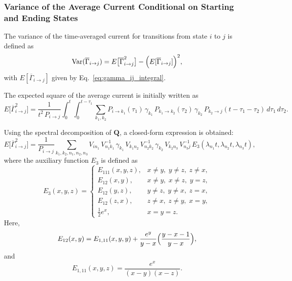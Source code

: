 \documentclass[pdflatex,sn-nature]{sn-jnl}%
\theoremstyle{thmstyleone}%
\theoremstyle{thmstyletwo}%
\theoremstyle{thmstylethree}%
\begin{document}
\subsubsection{Variance of the Average Current Conditional on Starting and Ending States}

The variance of the time-averaged current for transitions from state \(i\) to \(j\) is defined as
\begin{equation}
\mathrm{Var}(\overline{\Gamma}_{i\rightarrow j}) = E\bigl[\overline{\Gamma}_{i\rightarrow j}^2\bigr] - \Bigl(E[\overline{\Gamma}_{i\rightarrow j}]\Bigr)^2,
\label{eq:variance_gamma_short}
	\end{equation}
	with \(E[\overline{\Gamma}_{i\rightarrow j}]\) given by Eq.~\ref{eq:gamma_ij_integral}.

The expected square of the average current is initially written as
\begin{equation}
E\bigl[\overline{\Gamma}_{i\rightarrow j}^2\bigr] = \frac{1}{t^2\,P_{i\rightarrow j}} \int_0^t\int_0^{t-\tau_1} \sum_{k_1,k_2} P_{i\rightarrow k_1}(\tau_1)\,\gamma_{k_1}\,P_{k_1\rightarrow k_2}(\tau_2)\,\gamma_{k_2}\,P_{k_2\rightarrow j}(t-\tau_1-\tau_2)\,d\tau_1\,d\tau_2.
\label{eq:expected_square_integral_short}
\end{equation}

Using the spectral decomposition of \(\mathbf{Q}\), a closed-form expression is obtained:
	\begin{equation}
	E\bigl[\overline{\Gamma}_{i\rightarrow j}^2\bigr] = \frac{1}{P_{i\rightarrow j}} \sum_{k_1,k_2,n_1,n_2,n_3} V_{i n_1}\,V^{-1}_{n_1 k_1}\,\gamma_{k_1}\,V_{k_1 n_2}\,V^{-1}_{n_2 k_2}\,\gamma_{k_2}\,V_{k_2 n_3}\,V^{-1}_{n_3 j}\,E_3(\lambda_{n_1}t,\lambda_{n_2}t,\lambda_{n_3}t),
\label{eq:expected_square_closed_short}
\end{equation}
where the auxiliary function \(E_3\) is defined as
\begin{equation}
E_3(x,y,z)= 
\begin{cases}
E_{111}(x,y,z), & x\neq y,\; y\neq z,\; z\neq x,\\[1mm]
E_{12}(x,y),   & x\neq y,\; x\neq z,\; y=z,\\[1mm]
	E_{12}(y,z),   & y\neq z,\; y\neq x,\; z=x,\\[1mm]
	E_{12}(z,x),   & z\neq x,\; z\neq y,\; x=y,\\[1mm]
\frac{1}{2}e^x, & x=y=z.
\end{cases}
\label{eq:E3_short}
\end{equation}
Here,
	\begin{equation}
	E_{12}(x,y)= E_{1,11}(x,y,y) + \frac{e^y}{y-x}\Bigl(\frac{y-x-1}{y-x}\Bigr),
		\label{eq:E12_short}
		\end{equation}
		and
		\begin{equation}
		E_{1,11}(x,y,z)= \frac{e^x}{(x-y)(x-z)}.
	\label{eq:E1_11_short}
	\end{equation}
\end{document}
